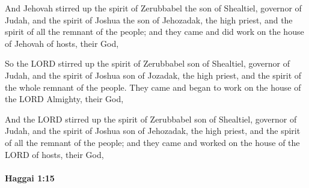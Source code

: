 			\begin{versebox}
					\item[BHS] 
					\item[LXX] 
					\item[ASV] And Jehovah stirred up the spirit of Zerubbabel the son of Shealtiel, governor of Judah, and the spirit of Joshua the son of Jehozadak, the high priest, and the spirit of all the remnant of the people; and they came and did work on the house of Jehovah of hosts, their God,
					\item[NIV] So the LORD stirred up the spirit of Zerubbabel son of Shealtiel, governor of Judah, and the spirit of Joshua son of Jozadak, the high priest, and the spirit of the whole remnant of the people. They came and began to work on the house of the LORD Almighty, their God,
					\item[NRSV] And the LORD stirred up the spirit of Zerubbabel son of Shealtiel, governor of Judah, and the spirit of Joshua son of Jehozadak, the high priest, and the spirit of all the remnant of the people; and they came and worked on the house of the LORD of hosts, their God,
			\end{versebox}

		\paragraph{Haggai 1:15} %
			\label{HAGGAI-1-15}

